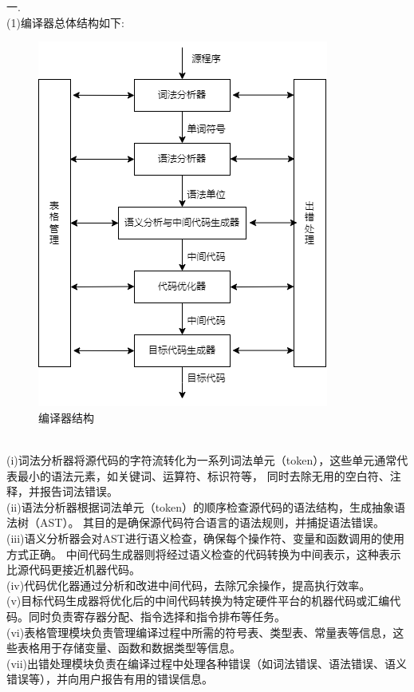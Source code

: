 \documentclass{article}
\begin{document}
一.\\
(1)编译器总体结构如下: \\
\begin{figure}[htbp]
    \centering
    \includegraphics[scale=0.5]{complier.png}
    \caption{编译器结构}
\end{figure}
\\
(i)词法分析器将源代码的字符流转化为一系列词法单元（token），这些单元通常代表最小的语法元素，如关键词、运算符、标识符等，
同时去除无用的空白符、注释，并报告词法错误。\\
(ii)语法分析器根据词法单元（token）的顺序检查源代码的语法结构，生成抽象语法树（AST）。
其目的是确保源代码符合语言的语法规则，并捕捉语法错误。\\
(iii)语义分析器会对AST进行语义检查，确保每个操作符、变量和函数调用的使用方式正确。
中间代码生成器则将经过语义检查的代码转换为中间表示，这种表示比源代码更接近机器代码。\\
(iv)代码优化器通过分析和改进中间代码，去除冗余操作，提高执行效率。\\
(v)目标代码生成器将优化后的中间代码转换为特定硬件平台的机器代码或汇编代码。同时负责寄存器分配、指令选择和指令排布等任务。\\
(vi)表格管理模块负责管理编译过程中所需的符号表、类型表、常量表等信息，这些表格用于存储变量、函数和数据类型等信息。\\
(vii)出错处理模块负责在编译过程中处理各种错误（如词法错误、语法错误、语义错误等），并向用户报告有用的错误信息。\\
\end{document}
